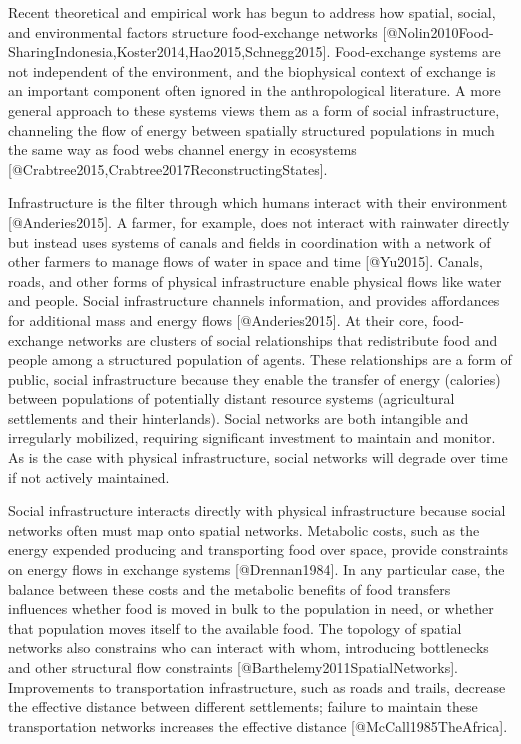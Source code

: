 \documentclass[fleqn,10pt]{wlscirep}
\begin{document}
Recent theoretical and empirical work has begun to address how spatial, social, and environmental factors structure food-exchange networks [@Nolin2010Food-SharingIndonesia,Koster2014,Hao2015,Schnegg2015]. Food-exchange systems are not independent of the environment, and the biophysical context of exchange is an important component often ignored in the anthropological literature. A more general approach to these systems views them as a form of social infrastructure, channeling the flow of energy between spatially structured populations in much the same way as food webs channel energy in ecosystems [@Crabtree2015,Crabtree2017ReconstructingStates].


Infrastructure is the filter through which humans interact with their environment [@Anderies2015]. A farmer, for example, does not interact with rainwater directly but instead uses systems of canals and fields in coordination with a network of other farmers to manage flows of water in space and time [@Yu2015]. Canals, roads, and other forms of physical infrastructure enable physical flows like water and people. Social infrastructure channels information, and provides affordances for additional mass and energy flows [@Anderies2015]. At their core, food-exchange networks are clusters of social relationships that redistribute food and people among a structured population of agents. These relationships are a form of public, social infrastructure because they enable the transfer of energy (calories) between populations of potentially distant resource systems (agricultural settlements and their hinterlands). Social networks are both intangible and irregularly mobilized, requiring significant investment to maintain and monitor. As is the case with physical infrastructure, social networks will degrade over time if not actively maintained.

Social infrastructure interacts directly with physical infrastructure because social networks often must map onto spatial networks. Metabolic costs, such as the energy expended producing and transporting food over space, provide constraints on energy flows in exchange systems [@Drennan1984]. In any particular case, the balance between these costs and the metabolic benefits of food transfers influences whether food is moved in bulk to the population in need, or whether that population moves itself to the available food. The topology of spatial networks also constrains who can interact with whom, introducing bottlenecks and other structural flow constraints [@Barthelemy2011SpatialNetworks]. Improvements to transportation infrastructure, such as roads and trails, decrease the effective distance between different settlements; failure to maintain these transportation networks increases the effective distance [@McCall1985TheAfrica].
\end{document}

